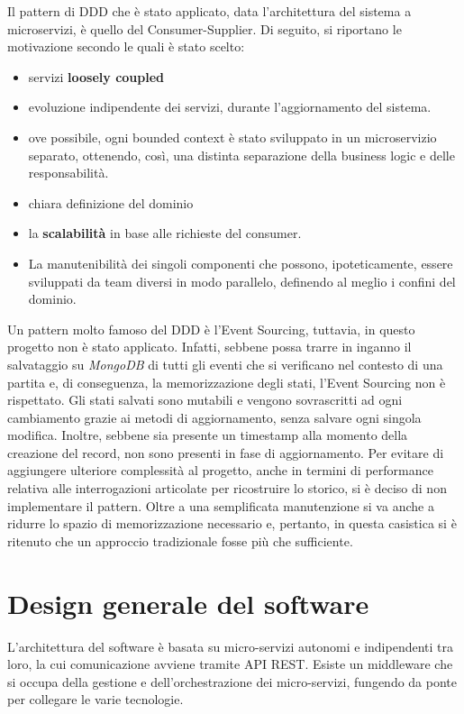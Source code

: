 Il pattern di DDD che è stato applicato, data l'architettura del sistema a microservizi, è quello del Consumer-Supplier.
Di seguito, si riportano le motivazione secondo le quali è stato scelto:
\begin{itemize}
    \item servizi \textbf{loosely coupled}
    \item evoluzione indipendente dei servizi, durante l'aggiornamento del sistema.
    \item ove possibile, ogni bounded context è stato sviluppato in un microservizio separato, ottenendo, così, una distinta separazione della business logic e delle responsabilità. 
    \item chiara definizione del dominio
    \item la \textbf{scalabilità} in base alle richieste del consumer.
    \item La manutenibilità dei singoli componenti che possono, ipoteticamente, essere sviluppati da team diversi in modo parallelo, definendo al meglio i confini del dominio.

\end{itemize}

Un pattern molto famoso del DDD è l'Event Sourcing, tuttavia, in questo progetto non è stato applicato.
Infatti, sebbene possa trarre in inganno il salvataggio su \textit{MongoDB} di tutti gli eventi che si
verificano nel contesto di una partita e, di conseguenza, la memorizzazione degli stati, 
l'Event Sourcing non è rispettato.
Gli stati salvati sono mutabili e vengono sovrascritti ad ogni cambiamento grazie ai metodi di
 aggiornamento, senza salvare ogni singola modifica. Inoltre, sebbene sia presente un timestamp alla 
 momento della creazione del record, non sono presenti in fase di aggiornamento.
Per evitare di aggiungere ulteriore complessità al progetto, anche in termini di performance relativa
alle interrogazioni articolate per ricostruire lo storico, si è deciso di non implementare il pattern.
Oltre a una semplificata manutenzione si va anche a ridurre lo spazio di memorizzazione necessario e, pertanto,
in questa casistica si è ritenuto che un approccio tradizionale fosse più che sufficiente.  

\section{Design generale del software}

L'architettura del software è basata su micro-servizi autonomi e indipendenti tra loro, la cui comunicazione avviene tramite API REST.
Esiste un middleware che si occupa della gestione e dell'orchestrazione dei micro-servizi, fungendo da ponte per collegare le varie tecnologie.

